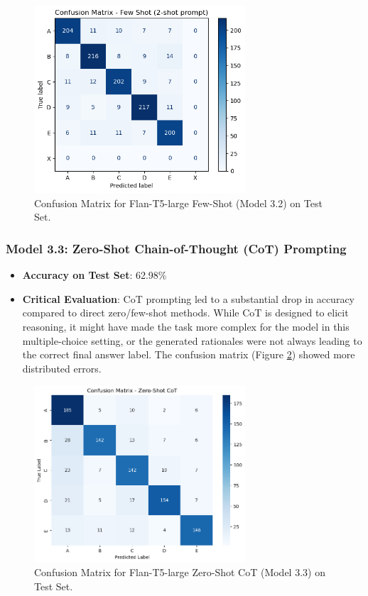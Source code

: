 \documentclass[10.5pt]{article}
\begin{document}
\begin{figure}[htbp]
    \centering
    \includegraphics[width=0.7\textwidth]{images/model3_2_confusion_matrix.png}
    \caption{Confusion Matrix for Flan-T5-large Few-Shot (Model 3.2) on Test Set.}
    \label{fig:conf_matrix_model3_2}
\end{figure}

\subsubsection{Model 3.3: Zero-Shot Chain-of-Thought (CoT) Prompting}
\begin{itemize}
    \item \textbf{Accuracy on Test Set}: 62.98\%
    \item \textbf{Critical Evaluation}: CoT prompting led to a substantial drop in accuracy compared to direct zero/few-shot methods. While CoT is designed to elicit reasoning, it might have made the task more complex for the model in this multiple-choice setting, or the generated rationales were not always leading to the correct final answer label. The confusion matrix (Figure \ref{fig:conf_matrix_model3_3}) showed more distributed errors.
\end{itemize}

\begin{figure}[htbp]
    \centering
    \includegraphics[width=0.7\textwidth]{images/model3_3_confusion_matrix.png}
    \caption{Confusion Matrix for Flan-T5-large Zero-Shot CoT (Model 3.3) on Test Set.}
    \label{fig:conf_matrix_model3_3}
\end{figure}
\end{document}
